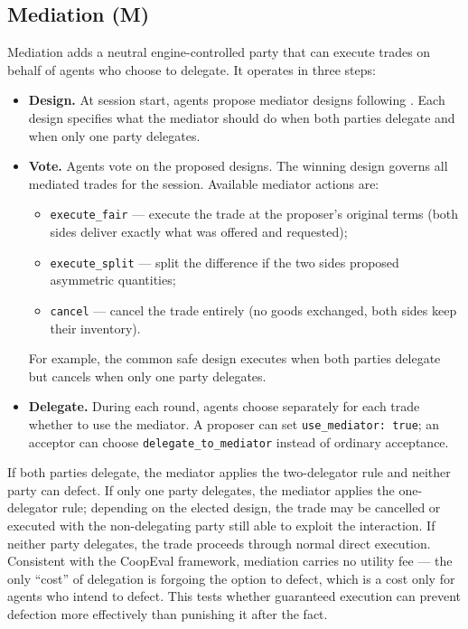 \documentclass{article}
\begin{document}
\subsection{Mediation (M)}

Mediation adds a neutral engine-controlled party that can execute trades on behalf of agents who choose to delegate. It operates in three steps:

\begin{itemize}
  \item \textbf{Design.} At session start, agents propose mediator designs following \citet{coopeval}. Each design specifies what the mediator should do when both parties delegate and when only one party delegates.
  \item \textbf{Vote.} Agents vote on the proposed designs. The winning design governs all mediated trades for the session. Available mediator actions are:
  \begin{itemize}
    \item \texttt{execute\_fair} --- execute the trade at the proposer's original terms (both sides deliver exactly what was offered and requested);
    \item \texttt{execute\_split} --- split the difference if the two sides proposed asymmetric quantities;
    \item \texttt{cancel} --- cancel the trade entirely (no goods exchanged, both sides keep their inventory).
  \end{itemize}
  For example, the common safe design executes when both parties delegate but cancels when only one party delegates.
  \item \textbf{Delegate.} During each round, agents choose separately for each trade whether to use the mediator. A proposer can set \texttt{use\_mediator: true}; an acceptor can choose \texttt{delegate\_to\_mediator} instead of ordinary acceptance.
\end{itemize}

If both parties delegate, the mediator applies the two-delegator rule and neither party can defect. If only one party delegates, the mediator applies the one-delegator rule; depending on the elected design, the trade may be cancelled or executed with the non-delegating party still able to exploit the interaction. If neither party delegates, the trade proceeds through normal direct execution. Consistent with the CoopEval framework, mediation carries no utility fee --- the only ``cost'' of delegation is forgoing the option to defect, which is a cost only for agents who intend to defect. This tests whether guaranteed execution can prevent defection more effectively than punishing it after the fact.
\end{document}
